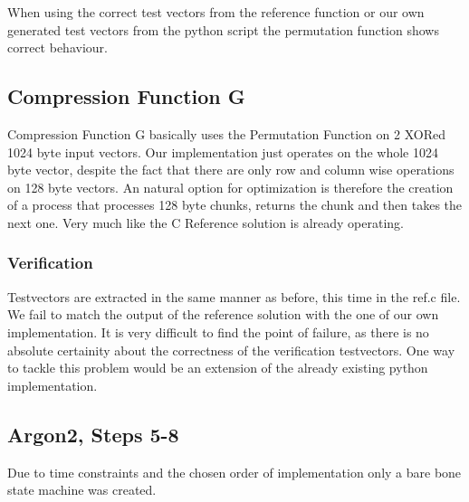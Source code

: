 When using the correct test vectors from the reference function or our own
generated test vectors from the python script the permutation function shows correct
behaviour.

\subsection{Compression Function G}
Compression Function G basically uses the Permutation Function on 2 XORed 1024 byte input
vectors.
Our implementation just operates on the whole 1024 byte vector, despite the fact that
there are only row and column wise operations on 128 byte vectors. An natural option for
optimization is therefore the creation of a process that processes 128 byte chunks,
returns the chunk and then takes the next one. Very much like the C Reference solution is
already operating. 

\subsubsection{Verification}
Testvectors are extracted in the same manner as before, this time in the ref.c file.
We fail to match the output of the reference solution with the one of our own implementation.
It is very difficult to find the point of failure, as there is no absolute certainity
about the correctness of the verification testvectors. One way to tackle this problem
would be an extension of the already existing python implementation.

\subsection{Argon2, Steps 5-8}
Due to time constraints and the chosen order of implementation only a bare bone state
machine was created.


